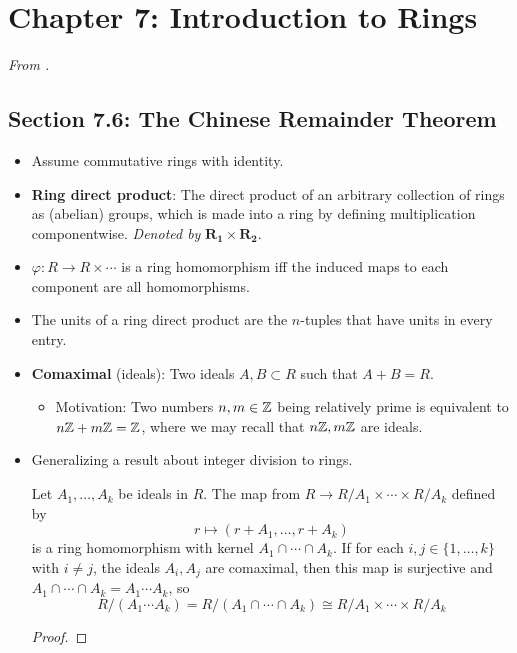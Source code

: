 \documentclass[../notes.tex]{subfiles}
\begin{document}
\section{Chapter 7: Introduction to Rings}
\emph{From \textcite{bib:DummitFoote}.}
\subsection*{Section 7.6: The Chinese Remainder Theorem}
\begin{itemize}
    \item {}Assume commutative rings with identity.
    \item \textbf{Ring direct product}: The direct product of an arbitrary collection of rings as (abelian) groups, which is made into a ring by defining multiplication componentwise. \emph{Denoted by} $\bm{R_1\times R_2}$.
    \item $\varphi:R\to R\times\cdots$ is a ring homomorphism iff the induced maps to each component are all homomorphisms.
    \item The units of a ring direct product are the $n$-tuples that have units in every entry.
    \item \textbf{Comaximal} (ideals): Two ideals $A,B\subset R$ such that $A+B=R$.
    \begin{itemize}
        \item Motivation: Two numbers $n,m\in\mathbb{Z}$ being relatively prime is equivalent to $n\mathbb{Z}+m\mathbb{Z}=\mathbb{Z}$, where we may recall that $n\mathbb{Z},m\mathbb{Z}$ are ideals.
    \end{itemize}
    \item Generalizing a result about integer division to rings.
    \begin{theorem}\label{trm:7.17}
        Let $A_1,\dots,A_k$ be ideals in $R$. The map from $R\to R/A_1\times\cdots\times R/A_k$ defined by
        \begin{equation*}
            r \mapsto (r+A_1,\dots,r+A_k)
        \end{equation*}
        is a ring homomorphism with kernel $A_1\cap\cdots\cap A_k$. If for each $i,j\in\{1,\dots,k\}$ with $i\neq j$, the ideals $A_i,A_j$ are comaximal, then this map is surjective and $A_1\cap\cdots\cap A_k=A_1\cdots A_k$, so
        \begin{equation*}
            R/(A_1\cdots A_k) = R/(A_1\cap\cdots\cap A_k)
            \cong R/A_1\times\cdots\times R/A_k
        \end{equation*}
        \begin{proof}

\end{proof}
\end{theorem}
\end{itemize}
\end{document}
